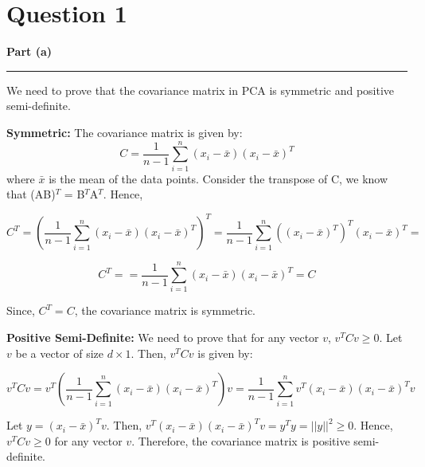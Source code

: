 \documentclass[a4paper,12pt]{article}
\title{\cooltitle{CS663 Assignment-4}}
\author{{\bf Saksham Rathi, Kavya Gupta, Shravan Srinivasa Raghavan} \\
\small Department of Computer Science, \\
Indian Institute of Technology Bombay \\}
\date{}
\newenvironment{solution}[2][]{%
    \begin{mdframed}[linecolor=blue!70!black, linewidth=2pt, roundcorner=10pt, backgroundcolor=yellow!10!white, skipabove=12pt, skipbelow=12pt]%
        \textbf{\large #2}
        \par\noindent\rule{\textwidth}{0.4pt}
}{
    \end{mdframed}
}
\begin{document}
\maketitle

\section*{Question 1}

\begin{solution}{Part (a)}
We need to prove that the covariance matrix in PCA is symmetric and positive semi-definite.

\textbf{Symmetric:} The covariance matrix is given by:
\begin{equation}
  C = \frac{1}{n-1} \sum_{i=1}^{n} (x_i - \bar{x})(x_i - \bar{x})^T
\end{equation}
where $\bar{x}$ is the mean of the data points. Consider the transpose of C, we know that (AB)$^T$ = B$^T$A$^T$. Hence,

\begin{equation}
  C^T = \left(\frac{1}{n-1} \sum_{i=1}^{n} (x_i - \bar{x})(x_i - \bar{x})^T\right)^T = \frac{1}{n-1} \sum_{i=1}^{n} ((x_i - \bar{x})^T)^T(x_i - \bar{x})^T = 
\end{equation}

\begin{equation}
  C^T = = \frac{1}{n-1} \sum_{i=1}^{n} (x_i - \bar{x})(x_i - \bar{x})^T = C
\end{equation}

Since, $C^T = C$, the covariance matrix is symmetric.

\textbf{Positive Semi-Definite:} We need to prove that for any vector $v$, $v^TCv \geq 0$. Let $v$ be a vector of size $d \times 1$. Then, $v^TCv$ is given by:

\begin{equation}
  v^TCv = v^T\left(\frac{1}{n-1} \sum_{i=1}^{n} (x_i - \bar{x})(x_i - \bar{x})^T\right)v = \frac{1}{n-1} \sum_{i=1}^{n} v^T(x_i - \bar{x})(x_i - \bar{x})^Tv
\end{equation}

Let $y = (x_i - \bar{x})^Tv$. Then, $v^T(x_i - \bar{x})(x_i - \bar{x})^Tv = y^Ty = ||y||^2 \geq 0$. Hence, $v^TCv \geq 0$ for any vector $v$. Therefore, the covariance matrix is positive semi-definite.
\end{solution}
\end{document}
